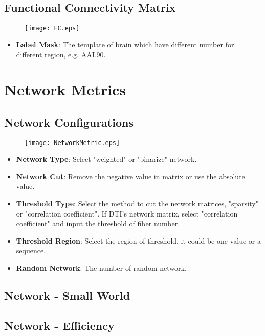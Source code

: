 \documentclass[11pt]{article}
\begin{document}
		\subsection{Functional Connectivity Matrix}
			\begin{figure}
				\begin{center}
					\texttt{[image: FC.eps]}
				\end{center}
			\end{figure}
			\begin{itemize}
				\item \textbf{Label Mask}: The template of brain which have different number for different region, e.g. AAL90.
			\end{itemize}
	\section{Network Metrics}
		\subsection{Network Configurations}
			\begin{figure}
				\begin{center}
					\texttt{[image: NetworkMetric.eps]}
				\end{center}
			\end{figure}
			\begin{itemize}
				\item \textbf{Network Type}: Select "weighted" or "binarize" network.
				\item \textbf{Network Cut}: Remove the negative value in matrix or use the absolute value.
				\item \textbf{Threshold Type}: Select the method to cut the network matrices, "sparsity" or "correlation coefficient". 
					If DTI's network matrix, select "correlation coefficient" and input the threshold of fiber number.
				\item \textbf{Threshold Region}: Select the region of threshold, it could be one value or a sequence.
				\item \textbf{Random Network}: The number of random network.
			\end{itemize}
		\subsection{Network - Small World}
		\subsection{Network - Efficiency}
\end{document}
